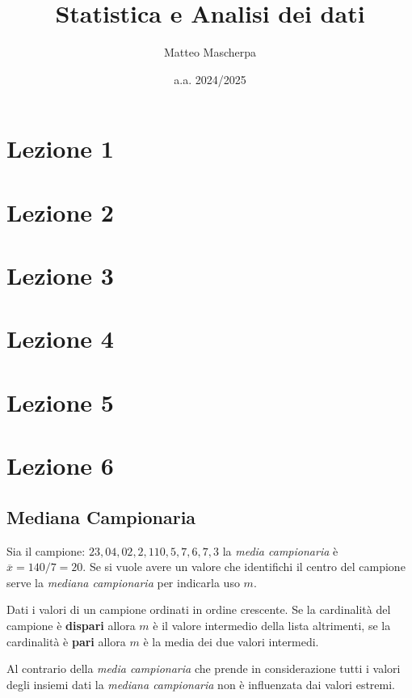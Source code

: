 \documentclass{article}
\title{Statistica e Analisi dei dati}
\author{Matteo Mascherpa}
\date{a.a. 2024/2025}
\begin{document}
\maketitle

\tableofcontents

\section*{Lezione 1}


\section*{Lezione 2}

\section*{Lezione 3}

\section*{Lezione 4}

\section*{Lezione 5}

\section*{Lezione 6}

\subsection*{Mediana Campionaria}

Sia il campione: $23,04,02,2,110,5,7,6,7,3$ la \textit{media campionaria} è $\overline{x} = 140/7=20$. Se si vuole avere un valore che identifichi il centro del campione serve la \textit{mediana campionaria} per indicarla uso $m$.

\begin{tcolorbox}
 Dati i valori di un campione ordinati in ordine crescente. Se la cardinalità del campione è \textbf{dispari} allora $m$ è il valore intermedio della lista altrimenti, se la cardinalità è \textbf{pari} allora $m$ è la media dei due valori intermedi.  
\end{tcolorbox}

Al contrario della \textit{media campionaria} che prende in considerazione tutti i valori degli insiemi dati la \textit{mediana campionaria} non è influenzata dai valori estremi.
\end{document}
